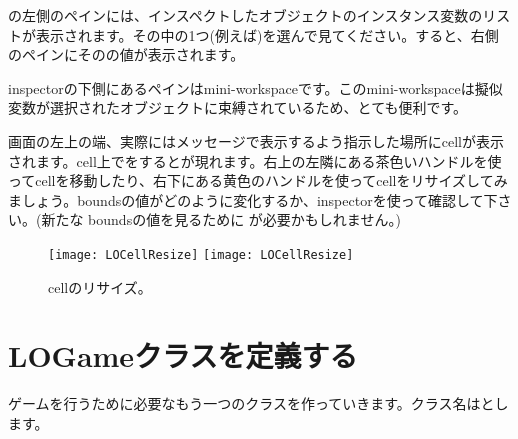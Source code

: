 \documentclass[a4paper,10pt,twoside]{book}
\begin{document}
の左側のペインには、インスペクトしたオブジェクトのインスタンス変数のリストが表示されます。その中の1つ(例えば\mbox{})を選んで見てください。すると、右側のペインにそのの値が表示されます。


inspectorの下側にあるペインはmini-workspaceです。このmini-workspaceは擬似変数\self が選択されたオブジェクトに束縛されているため、とても便利です。


画面の左上の端、実際にはメッセージで表示するよう指示した場所にcellが表示されます。cell上で\metaclick をするとが現れます。右上の左隣にある茶色いハンドルを使ってcellを移動したり、右下にある黄色のハンドルを使ってcellをリサイズしてみましょう。boundsの値がどのように変化するか、inspectorを使って確認して下さい。(新たな boundsの値を見るために  \actclick が必要かもしれません。)

\begin{figure}[htbp]
\centering
\ifluluelse
	{\texttt{[image: LOCellResize]} }
	{\texttt{[image: LOCellResize]} }
\caption{cellのリサイズ。}
\end{figure}


\section{LOGameクラスを定義する}

ゲームを行うために必要なもう一つのクラスを作っていきます。クラス名はとします。

\end{document}
